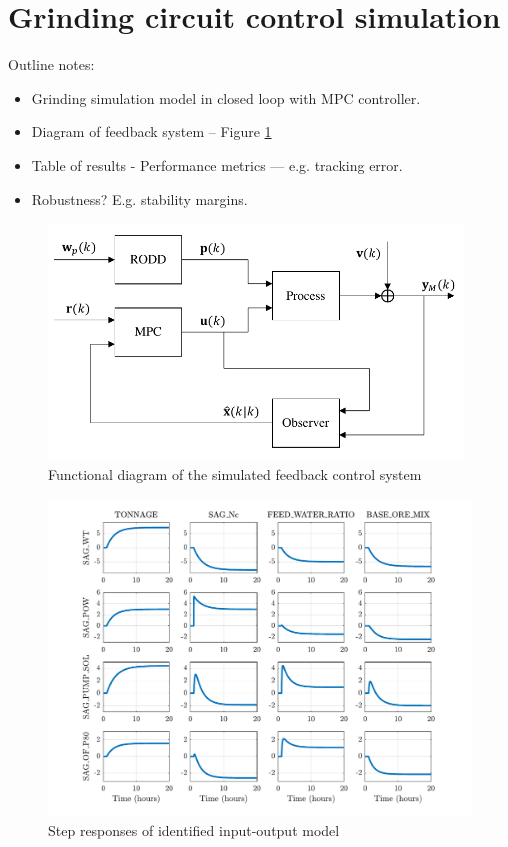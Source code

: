 \section{Grinding circuit control simulation} \label{section:sim-ore-mimo-ctrl} 

Outline notes:
\begin{itemize}
	\item Grinding simulation model in closed loop with MPC controller.
	\item Diagram of feedback system – Figure \ref{fig:sim-mpc-diag}
	\item Table of results - Performance metrics — e.g. tracking error.
	\item Robustness?  E.g. stability margins.
\end{itemize}

\begin{figure}[htp]
	\centering
	\includegraphics[width=11cm]{images/sim-mpc-diag.pdf}
	\caption{Functional diagram of the simulated feedback control system}
	\label{fig:sim-mpc-diag}
\end{figure}

\begin{figure}[htp]
	\centering
	\includegraphics[width=15.5cm]{images/mpc4x4_stepresp_matrix.pdf}
	\caption{Step responses of identified input-output model}
	\label{fig:mpc4x4-stepresp-matrix}
\end{figure}


